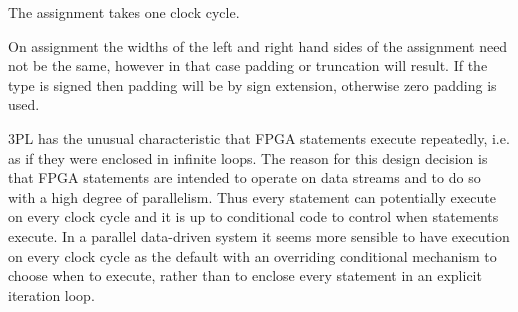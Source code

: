 \documentclass[10pt,a4paper,twoside,fleqn]{article}
\begin{document}
    The assignment takes one clock cycle.
    
    On assignment the widths of the left and right hand sides of the assignment
    need not be the same, however in that case padding or truncation will result.
    If the type is signed then padding will be by sign extension, otherwise
    zero padding is used.
    
    3PL has the unusual characteristic that FPGA statements execute repeatedly,
    i.e. as if they were enclosed in infinite loops. The reason for this design
    decision is that FPGA statements are intended to operate on data streams
    and to do so with a high degree of parallelism. Thus every statement can
    potentially execute on every clock cycle and it is up to conditional
    code to control when statements execute. In a parallel data-driven
    system it seems more sensible to have execution on every clock cycle as
    the default with an overriding conditional mechanism to choose when to execute,
    rather than to enclose every statement in an explicit iteration loop.
    
\end{document}
